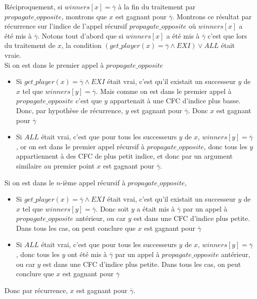 \documentclass[10pt,a4paper]{article}
\begin{document}
Réciproquement, si $winners[x] = \overline{\gamma}$ à la fin du traitement par $propagate\_opposite$, montrons que $x$ est gagnant pour $\overline{\gamma}$. Montrons ce résultat par récurrence sur l'indice de l'appel récursif $propagate\_opposite$ où $winners[x]$ a été mis à $\overline{\gamma}$. Notons tout d'abord que si $winners[x]$ a été mis à $\overline{\gamma}$ c'est que lors du traitement de $x$, la condition $(get\_player(x) = \overline{\gamma} \land EXI) \lor ALL $ était vraie.\\
Si on est dans le premier appel à $propagate\_opposite$
\begin{itemize}
	\item Si $get\_player(x) = \overline{\gamma} \land EXI$ était vrai, c'est qu'il existait un successeur $y$ de $x$ tel que $winners[y] = \overline{\gamma}$. Mais comme on est dans le premier appel à $propagate\_opposite$ c'est que $y$ appartenait à une CFC d'indice plus basse. Donc, par hypothèse de récurrence, $y$ est gagnant pour $\overline{\gamma}$. Donc $x$ est gagnant pour $\overline{\gamma}$
	\item Si $ALL$ était vrai, c'est que pour tous les successeurs $y$ de $x$, $winners[y] = \overline{\gamma}$, or on est dans le premier appel récursif à $propagate\_opposite$, donc tous les $y$ appartiennent à des CFC de plus petit indice, et donc par un argument similaire au premier point $x$ est gagnant pour $\overline{\gamma}$.
\end{itemize}
Si on est dans le $n$-ième appel récursif à $propagate\_opposite$,
\begin{itemize}
	\item Si $get\_player(x) = \overline{\gamma} \land EXI$ était vrai, c'est qu'il existait un successeur $y$ de $x$ tel que $winners[y] = \overline{\gamma}$. Donc soit $y$ a était mis à $\overline{\gamma}$ par un appel à $propagate\_opposite$ antérieur, ou car $y$ est dans une CFC d'indice plus petite. Dans tous les cas, on peut conclure que $x$ est gagnant pour $\overline{\gamma}$
	\item Si $ALL$ était vrai, c'est que pour tous les successeurs $y$ de $x$, $winners[y] = \overline{\gamma}$, donc tous les $y$  ont été mis à $\overline{\gamma}$ par un appel à $propagate\_opposite$ antérieur, ou car $y$ est dans une CFC d'indice plus petite. Dans tous les cas, on peut conclure que $x$ est gagnant pour $\overline{\gamma}$
\end{itemize}

Donc par récurrence, $x$ est gagnant  pour $\overline{\gamma}$.
\end{document}

